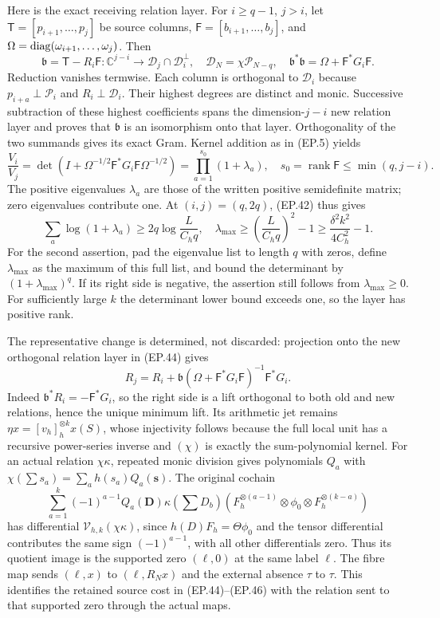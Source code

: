 \documentclass[11pt]{article}
\newcommand{\C}{\mathbb C}\newcommand{\R}{\mathbb R}
\begin{document}
Here is the exact receiving relation layer. For $i\ge q-1$, $j>i$,
let $\mathsf T=[p_{i+1},\ldots,p_j]$ be source columns,
$\mathsf F=[b_{i+1},\ldots,b_j]$, and
$\Omega=\operatorname{diag}(\omega_{i+1},\ldots,\omega_j)$. Then
\[
 \mathfrak b=\mathsf T-R_i\mathsf F:
 \C^{j-i}\longrightarrow\mathcal D_j\cap\mathcal D_i^\perp,
 \quad\mathcal D_N=\chi\mathcal P_{N-q},\quad
 \mathfrak b^*\mathfrak b=\Omega+\mathsf F^*G_i\mathsf F.
 \tag{EP.44}
\]
Reduction vanishes termwise. Each column is orthogonal to
$\mathcal D_i$ because $p_{i+a}\perp\mathcal P_i$ and
$R_i\perp\mathcal D_i$. Their highest degrees are distinct and
monic. Successive subtraction of these highest coefficients spans
the dimension-$j-i$ new relation layer and proves that $\mathfrak b$
is an isomorphism onto that layer. Orthogonality of the two summands
gives its exact Gram. Kernel addition as in (EP.5) yields
\[
 \frac{V_i}{V_j}
 =\det(I+\Omega^{-1/2}\mathsf F^*G_i\mathsf F\Omega^{-1/2})
 =\prod_{a=1}^{s_0}(1+\lambda_a),\quad
 s_0=\operatorname{rank}\mathsf F\le\min(q,j-i).
 \tag{EP.45}
\]
The positive eigenvalues $\lambda_a$ are those of the written
positive semidefinite matrix; zero eigenvalues contribute one.
At $(i,j)=(q,2q)$, (EP.42) thus gives
\[
 \sum_a\log(1+\lambda_a)\ge2q\log\frac{L}{C_hq},
 \quad
 \lambda_{\max}\ge\left(\frac{L}{C_hq}\right)^2-1
 \ge\frac{\delta^2k^2}{4C_h^2}-1.\tag{EP.46}
\]
For the second assertion, pad the eigenvalue list to length $q$
with zeros, define $\lambda_{\max}$ as the maximum of this full
list, and bound the determinant by $(1+\lambda_{\max})^q$.
If its right side is negative, the assertion still follows from
$\lambda_{\max}\ge0$. For sufficiently large $k$ the determinant
lower bound exceeds one, so the layer has positive rank.

The representative change is determined, not discarded: projection
onto the new orthogonal relation layer in (EP.44) gives
\[
 R_j=R_i+\mathfrak b(\Omega+\mathsf F^*G_i\mathsf F)^{-1}
                       \mathsf F^*G_i.\tag{EP.47}
\]
Indeed $\mathfrak b^*R_i=-\mathsf F^*G_i$, so the right side
is a lift orthogonal to both old and new relations, hence the unique
minimum lift. Its arithmetic jet remains
$\eta x=[v_h]_h^{\otimes k}x(S)$, whose injectivity follows because
the full local unit has a recursive power-series inverse and
$(\chi)$ is exactly the sum-polynomial kernel. For an actual relation
$\chi\kappa$, repeated monic division gives polynomials $Q_a$ with
$\chi(\sum s_a)=\sum_a h(s_a)Q_a(\mathbf s)$. The original cochain
\[
 \sum_{a=1}^k(-1)^{a-1}Q_a(\mathbf D)\kappa(\sum D_b)
 (F_h^{\otimes(a-1)}\otimes\phi_0\otimes F_h^{\otimes(k-a)})
 \tag{EP.48}
\]
has differential $\mathcal V_{h,k}(\chi\kappa)$, since
$h(D)F_h=\Theta\phi_0$ and the tensor differential contributes
the same sign $(-1)^{a-1}$, with all other differentials zero.
Thus its quotient image is the supported zero $(\ell,0)$ at the
same label $\ell$. The fibre map sends $(\ell,x)$ to
$(\ell,R_Nx)$ and the external absence $\tau$ to $\tau$.
This identifies the retained source cost in (EP.44)--(EP.46) with
the relation sent to that supported zero through the actual maps.
\end{document}
